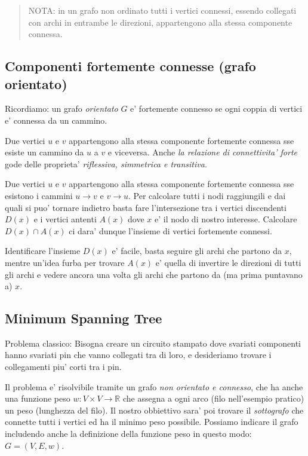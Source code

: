 \documentclass{article}
\begin{document}
\begin{quote}
  NOTA: in un grafo non ordinato tutti i vertici connessi, essendo collegati con
  archi in entrambe le direzioni, appartengono alla stessa componente connessa.
\end{quote}

\subsection{Componenti fortemente connesse (grafo orientato)}

Ricordiamo: un grafo \emph{orientato} $G$ e' fortemente connesso se ogni coppia
di vertici e' connessa da un cammino.

Due vertici $u$ e $v$ appartengono alla stessa componente fortemente connessa
sse esiste un cammino da $u$ a $v$ e viceversa. Anche \emph{la relazione di 
connettivita' forte} gode delle proprieta' \emph{riflessiva, simmetrica e transitiva}.

Due vertici $u$ e $v$ appartengono alla stessa componente fortemente connessa sse
esistono i cammini $u \to v$ e $v \to u$. Per calcolare tutti i nodi raggiungili
e dai quali si puo' tornare indietro basta fare l'intersezione tra i vertici
discendenti $D(x)$ e i vertici antenti $A(x)$ dove $x$ e' il nodo di nostro interesse.
Calcolare $D(x) \cap A(x)$ ci dara' dunque l'insieme di vertici fortemente connessi.

Identificare l'insieme $D(x)$ e' facile, basta seguire gli archi che partono da
$x$, mentre un'idea furba per trovare $A(x)$ e' quella di invertire le direzioni
di tutti gli archi e vedere ancora una volta gli archi che partono da (ma prima
puntavano a) $x$.

\subsection{Minimum Spanning Tree}

Problema classico: Bisogna creare un circuito stampato dove svariati componenti
hanno svariati pin che vanno collegati tra di loro, e desideriamo trovare i
collegamenti piu' corti tra i pin.

Il problema e' risolvibile tramite un grafo \emph{non orientato e connesso}, che
ha anche una funzione peso $w: V \times V \to \mathbb{R}$ che assegna a ogni arco
(filo nell'esempio pratico) un peso (lunghezza del filo). Il nostro obbiettivo
sara' poi trovare il \emph{sottografo} che connette tutti i vertici ed ha il
minimo peso possibile.
Possiamo indicare il grafo includendo anche la definizione della funzione peso
in questo modo: $G = (V, E, w)$.
\end{document}
